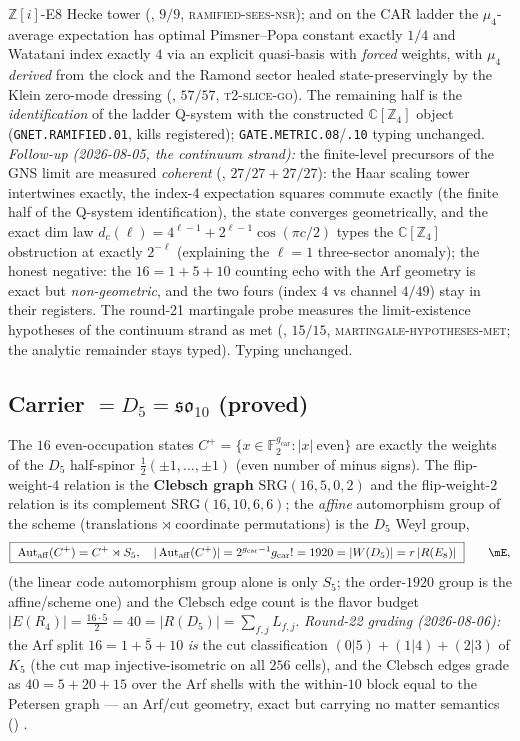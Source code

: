 \documentclass[11pt,a4paper]{article}
\newcommand{\gcar}{g_{\mathrm{car}}}
\newcommand{\Z}{\mathbb{Z}}
\theoremstyle{definition}
\begin{document}
$\Z[i]$-E8 Hecke tower (,
$9/9$, \textsc{ramified-sees-nsr}); and on the CAR ladder the
$\mu_4$-average expectation has optimal Pimsner--Popa constant
exactly $1/4$ and Watatani index exactly $4$ via an explicit
quasi-basis with \emph{forced} weights, with $\mu_4$ \emph{derived}
from the clock and the Ramond sector healed state-preservingly by
the Klein zero-mode dressing (,
$57/57$, \textsc{t2-slice-go}).  The remaining half is the
\emph{identification} of the ladder Q-system with the constructed
$\mathbb C[\Z_4]$ object (\texttt{GNET.RAMIFIED.01}, kills
registered); \texttt{GATE.METRIC.08}/\texttt{.10} typing unchanged.
\emph{Follow-up (2026-08-05, the continuum strand):} the
finite-level precursors of the GNS limit are measured
\emph{coherent} (, $27/27+27/27$):
the Haar scaling tower intertwines exactly, the index-4
expectation squares commute exactly (the finite half of the
Q-system identification), the state converges geometrically, and
the exact dim law $d_c(\ell)=4^{\ell-1}+2^{\ell-1}\cos(\pi c/2)$
types the $\mathbb C[\Z_4]$ obstruction at exactly $2^{-\ell}$
(explaining the $\ell=1$ three-sector anomaly); the honest
negative: the $16=1{+}5{+}10$ counting echo with the Arf geometry
is exact but \emph{non-geometric}, and the two fours (index $4$
vs channel $4/49$) stay in their registers.  The round-21
martingale probe measures the limit-existence hypotheses of the
continuum strand as met
(, $15/15$,
\textsc{martingale-hypotheses-met}; the analytic remainder stays
typed).  Typing unchanged.

\TFPTdoublepushout

\subsection{Carrier $=D_5=\mathfrak{so}_{10}$ (proved)}
The $16$ even-occupation states $C^+=\{x\in\mathbb F_2^{\gcar}:|x|\ \text{even}\}$ are exactly the
weights of the $D_5$ half-spinor $\tfrac12(\pm1,\dots,\pm1)$ (even number of minus signs). The
flip-weight-$4$ relation is the \textbf{Clebsch graph} $\mathrm{SRG}(16,5,0,2)$ and the flip-weight-$2$
relation is its complement $\mathrm{SRG}(16,10,6,6)$; the \emph{affine} automorphism group of the scheme
(translations $\rtimes$ coordinate permutations) is the $D_5$ Weyl group,
\begin{equation}
  \boxed{\ \operatorname{Aut}_{\mathrm{aff}}(C^+)=C^+\rtimes S_5,\quad |\operatorname{Aut}_{\mathrm{aff}}(C^+)|=2^{\gcar-1}\gcar!=1920=|W(D_5)|=r\,|R(E_8)|\ }\qquad\mE ,
\end{equation}
(the linear code automorphism group alone is only $S_5$; the order-$1920$ group is the affine/scheme one)
and the Clebsch edge count is the flavor budget $|E(R_4)|=\tfrac{16\cdot5}{2}=40=|R(D_5)|=\sum_{f,j}L_{f,j}$.
\emph{Round-22 grading (2026-08-06):} the Arf split $16=1+\bar5+10$ \emph{is} the cut
classification $(0|5)+(1|4)+(2|3)$ of $K_5$ (the cut map injective-isometric on all $256$ cells),
and the Clebsch edges grade as $40=5+20+15$ over the Arf shells with the within-$10$ block equal to
the Petersen graph --- an Arf/cut geometry, exact but carrying no matter semantics
() \mE.
\end{document}
